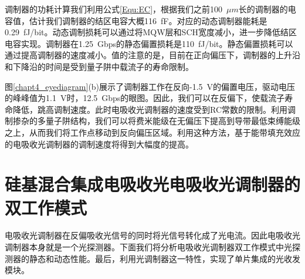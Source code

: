 调制器的功耗计算我们利用公式\ref{Equ:EC}，根据我们之前100~$\mu m$长的调制器的电容值\cite{fu20155}，估计我们调制器的结区电容大概116~fF。对应的动态调制器能耗是0.29~fJ/bit。动态调制损耗可以通过将MQW层和SCH宽度减小，进一步降低结区电容实现。调制器在1.25~Gbps的静态偏置损耗是110~fJ/bit。静态偏置损耗可以通过提高调制器的速度减小。值的注意的是，目前在正向偏压下，调制器的上升沿和下降沿的时间是受到量子阱中载流子的寿命限制。

图\ref{chapt4_eyediagram}(b)展示了调制器工作在反向-1.5~V的偏置电压，驱动电压的峰峰值为1.1~V时，12.5~Gbps的眼图。因此，我们可以在反偏下，使载流子寿命降低，跳高调制速度。此时电吸收光调制器的速度受到RC常数的限制。利用调制掺杂的多量子阱结构，我们可以将费米能级在无偏压下提高到导带最低束缚能级之上，从而我们将工作点移动到反向偏压区域\cite{livescu1988free,kalinovsky1993free}。利用这种方法，基于能带填充效应的电吸收光调制器的调制速度将得到大幅度的提高。

\section{硅基混合集成电吸收光电吸收光调制器的双工作模式}
电吸收光调制器在反偏吸收光信号的同时将光信号转化成了光电流。因此电吸收光调制器本身就是一个光探测器。下面我们将分析电吸收光调制器双工作模式中光探测器的静态和动态性能。最后，利用光调制器这一特性，实现了单片集成的光收发模块。
